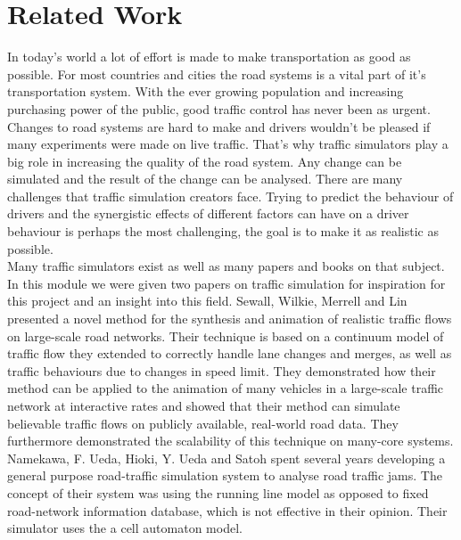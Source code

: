 \documentclass[11pt]{article}
\begin{document}
\section{Related Work}
In today's world a lot of effort is made to make transportation as good as possible. For most countries and cities the road systems is a vital part of it's transportation system. With the ever growing population and increasing purchasing power of the public, good traffic control has never been as urgent. Changes to road systems are hard to make and drivers wouldn't be pleased if many experiments were made on live traffic. That's why traffic simulators play a big role in increasing the quality of the road system. Any change can be simulated and the result of the change can be analysed. There are many challenges that traffic simulation creators face. Trying to predict the behaviour of drivers and the synergistic effects of different factors can have on a driver behaviour is perhaps the most challenging, the goal is to make it as realistic as possible.\\

Many traffic simulators exist as well as many papers and books on that subject. In this module we were given two papers on traffic simulation for inspiration for this project and an insight into this field. Sewall, Wilkie, Merrell and Lin \cite{sewall2010continuum}presented a novel method for the synthesis and animation of realistic traffic flows on large-scale road networks. Their technique is based on a continuum model of traffic flow they extended to correctly handle lane changes and merges, as well as traffic behaviours due to changes in speed limit. They demonstrated how their method can be applied to the animation of many vehicles in a large-scale traffic network at interactive rates and showed that their method can simulate believable traffic flows on publicly available, real-world road data. They furthermore demonstrated the scalability of this technique on many-core systems.\\

Namekawa, F. Ueda, Hioki, Y. Ueda and Satoh \cite{namekawa2005general} spent several years developing a general purpose road-traffic simulation system to analyse road traffic jams. The concept of their system was using the running line model as opposed to fixed road-network information database, which is not effective in their opinion. Their simulator uses the a cell automaton model.


\newpage	
\end{document}
